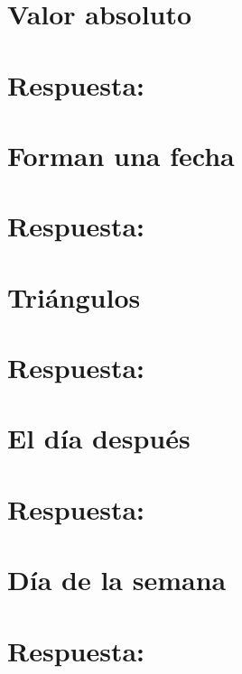 \section{Valor absoluto}


\ifshowanswers
\section*{Respuesta:}

\fi

\section{Forman una fecha}


\ifshowanswers
\section*{Respuesta:}

\fi

\section{Triángulos}


\ifshowanswers
\section*{Respuesta:}

\fi

\section{El día después}


\ifshowanswers
\section*{Respuesta:}

\fi

\section{Día de la semana}


\ifshowanswers
\section*{Respuesta:}

\fi

